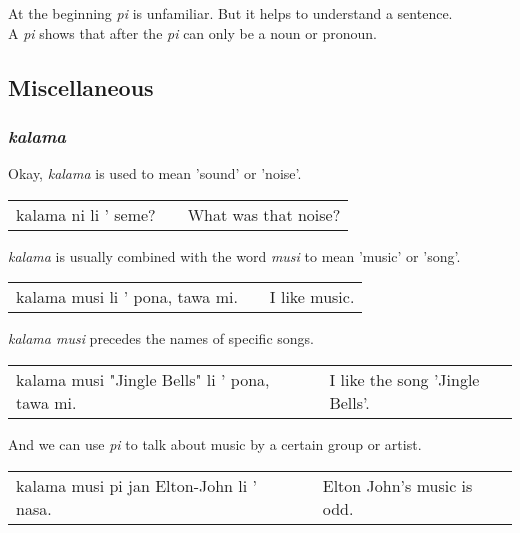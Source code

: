 At the beginning \textit{pi} is unfamiliar. 
But it helps to understand a sentence. \\
A \textit{pi} shows that after the \textit{pi} can only be a noun or pronoun.

%
\newpage
\subsection*{Miscellaneous}
%
\subsubsection*{\textit{kalama}}
%
Okay, \textit{kalama} is used to mean 'sound' or 'noise'.  \\
\begin{supertabular}{p{5,5cm}|ll}
kalama ni li ' seme? && What was that noise? \\
\end{supertabular}  

\textit{kalama} is usually combined with the word \textit{musi} to mean 'music' or 'song'. \\
\begin{supertabular}{p{5,5cm}|ll}
kalama musi li ' pona, tawa mi. && I like music. \\
\end{supertabular}  

\textit{kalama musi} precedes the names of specific songs. \\
\begin{supertabular}{p{5,5cm}|ll}
kalama musi "Jingle Bells" li ' pona, tawa mi. && I like the song 'Jingle Bells'. \\
\end{supertabular}  

And we can use \textit{pi} to talk about music by a certain group or artist. \\
\begin{supertabular}{p{5,5cm}|ll}
kalama musi pi jan Elton-John li ' nasa. && Elton John's music is odd. \\
\end{supertabular}  


